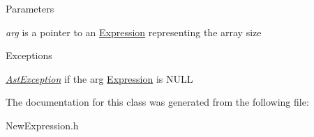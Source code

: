 \begin{DoxyParams}{Parameters}
\item[{\em arg}]is a pointer to an \hyperlink{classExpression}{Expression} representing the array size \end{DoxyParams}

\begin{DoxyExceptions}{Exceptions}
\item[{\em \hyperlink{classAstException}{AstException}}]if the arg \hyperlink{classExpression}{Expression} is NULL \end{DoxyExceptions}


The documentation for this class was generated from the following file:\begin{DoxyCompactItemize}
\item 
NewExpression.h\end{DoxyCompactItemize}
